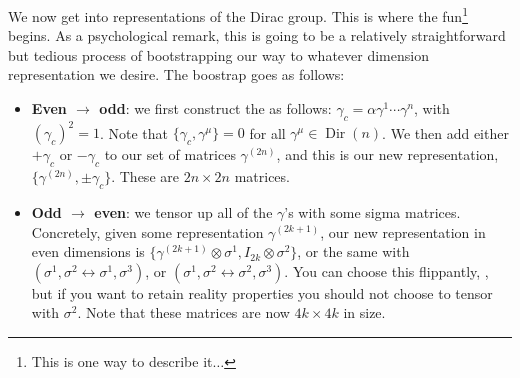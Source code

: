 \documentclass[11pt]{article}
\begin{document}
We now get into representations of the Dirac group.
This is where the fun\footnote{This is one way to describe
it$\ldots$} begins. As a psychological remark, this is going to be 
a relatively straightforward but tedious process of bootstrapping our 
way to whatever dimension representation we desire. The boostrap goes as follows:
\begin{itemize}
    \item \textbf{Even $\to$ odd}: we first construct the 
    as follows: $\gamma_c = \alpha \gamma^1 \cdots \gamma^n$,
    with $(\gamma_c)^2 = 1$. Note that $\{ \gamma_c, \gamma^\mu \} = 0$
    for all $\gamma^\mu \in \operatorname{Dir}(n)$. We then
    add either $+ \gamma_c$ or $- \gamma_c$ to our set of matrices
    $\gamma^{(2n)}$, and this is our new representation, $\{ \gamma^{(2n)}, \pm \gamma_c \}$.
    These are $2n \times 2n$ matrices.
    \item \textbf{Odd $\to$ even}: we tensor up all of the $\gamma$'s with some sigma matrices. 
    Concretely, given some representation $\gamma^{(2k + 1)}$, our new representation 
    in even dimensions is $\{ \gamma^{(2k + 1)} \otimes \sigma^1, I_{2k} \otimes \sigma^2 \}$,
    or the same with $(\sigma^1, \sigma^2 \leftrightarrow \sigma^1, \sigma^3)$,
    or $(\sigma^1, \sigma^2 \leftrightarrow \sigma^2, \sigma^3)$.
    You can choose this flippantly, , 
    but if you want to retain reality properties you should not
    choose to tensor with $\sigma^2$. Note that these matrices
    are now $4k \times 4k$ in size.
\end{itemize}
\end{document}
